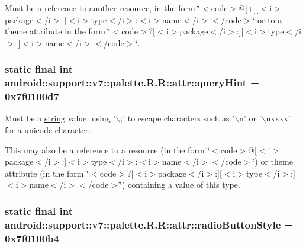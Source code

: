 Must be a reference to another resource, in the form \char`\"{}$<$code$>$@\mbox{[}+\mbox{]}\mbox{[}$<$i$>$package$<$/i$>$:\mbox{]}$<$i$>$type$<$/i$>$:$<$i$>$name$<$/i$>$$<$/code$>$\char`\"{} or to a theme attribute in the form \char`\"{}$<$code$>$?\mbox{[}$<$i$>$package$<$/i$>$:\mbox{]}\mbox{[}$<$i$>$type$<$/i$>$:\mbox{]}$<$i$>$name$<$/i$>$$<$/code$>$\char`\"{}. \hypertarget{classandroid_1_1support_1_1v7_1_1palette_1_1_r_1_1attr_6ef3fa5c88a9b0fb52c8cacb7cb51a72}{
\subsubsection[{queryHint}]{\setlength{\rightskip}{0pt plus 5cm}static final int android::support::v7::palette.R.R::attr::queryHint = 0x7f0100d7}}
\label{classandroid_1_1support_1_1v7_1_1palette_1_1_r_1_1attr_6ef3fa5c88a9b0fb52c8cacb7cb51a72}


Must be a \hyperlink{classandroid_1_1support_1_1v7_1_1palette_1_1_r_1_1string}{string} value, using '$\backslash$;' to escape characters such as '$\backslash$n' or '$\backslash$uxxxx' for a unicode character. 

This may also be a reference to a resource (in the form \char`\"{}$<$code$>$@\mbox{[}$<$i$>$package$<$/i$>$:\mbox{]}$<$i$>$type$<$/i$>$:$<$i$>$name$<$/i$>$$<$/code$>$\char`\"{}) or theme attribute (in the form \char`\"{}$<$code$>$?\mbox{[}$<$i$>$package$<$/i$>$:\mbox{]}\mbox{[}$<$i$>$type$<$/i$>$:\mbox{]}$<$i$>$name$<$/i$>$$<$/code$>$\char`\"{}) containing a value of this type. \hypertarget{classandroid_1_1support_1_1v7_1_1palette_1_1_r_1_1attr_9ef2cabd44fefa12b6a9a78db5a005a8}{
\subsubsection[{radioButtonStyle}]{\setlength{\rightskip}{0pt plus 5cm}static final int android::support::v7::palette.R.R::attr::radioButtonStyle = 0x7f0100b4}}
\label{classandroid_1_1support_1_1v7_1_1palette_1_1_r_1_1attr_9ef2cabd44fefa12b6a9a78db5a005a8}


